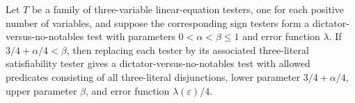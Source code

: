 \begin{theorem}
\label{FABL.e3LinDictatorTest_to_e3Sat}
\leanok
{}
Let $T$ be a family of three-variable linear-equation testers, one for each positive
number of variables, and suppose the corresponding sign testers form a
dictator-versus-no-notables test with parameters $0<\alpha<\beta\leq 1$ and error
function $\lambda$. If $3/4+\alpha/4<\beta$, then replacing each tester by its
associated three-literal satisfiability tester gives a dictator-versus-no-notables test
with allowed predicates consisting of all three-literal disjunctions, lower parameter
$3/4+\alpha/4$, upper parameter $\beta$, and error function $\lambda(\varepsilon)/4$.
\end{theorem}
